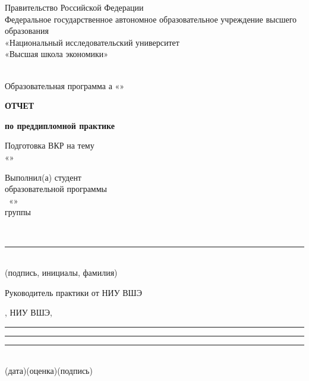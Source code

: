 \documentclass[12pt,a4paper]{extarticle}
\begin{document}
\pagestyle{empty}
\sloppy
\setlength{\parindent}{0pt}
\setlength{\parskip}{0pt}
\singlespacing

\begin{center}
Правительство Российской Федерации\\
Федеральное государственное автономное образовательное учреждение высшего образования\\
«Национальный исследовательский университет\\
«Высшая школа экономики»

\vspace{1.2em}
\hseFaculty\\
Образовательная программа \hseDegreeLevel{}а «\hseSpecialization»

\vspace{2.6em}
\textbf{\large ОТЧЕТ}

\vspace{0.4em}
\textbf{по преддипломной практике}

\vspace{0.9em}
Подготовка ВКР на тему\\
«\hseProjectName»
\end{center}

\vspace{2.8em}
\noindent\hfill
\begin{minipage}[t]{0.55\textwidth}
\raggedright
Выполнил(а) студент\\
образовательной программы\\
\hseProgramCode\ «\hseSpecialization»\\
группы \hseGroup

\vspace{0.6em}
\strut\hseAuthorName\\[-0.05cm]
\rule{6cm}{0.4pt}\\[-0.05cm]
{\scriptsize (подпись, инициалы, фамилия)}
\end{minipage}

\vspace{1.6em}
Руководитель практики от НИУ ВШЭ

\smallskip
\hseSupervisorName, НИУ ВШЭ, \hseSupervisorTitle

\vspace{0.7em}
\rule{2.6cm}{0.4pt}\quad\rule{3.2cm}{0.4pt}\quad\rule{4.2cm}{0.4pt}\\
{\scriptsize \hspace{0.4cm}(дата)\hspace{2.4cm}(оценка)\hspace{3.2cm}(подпись)}
\end{document}
